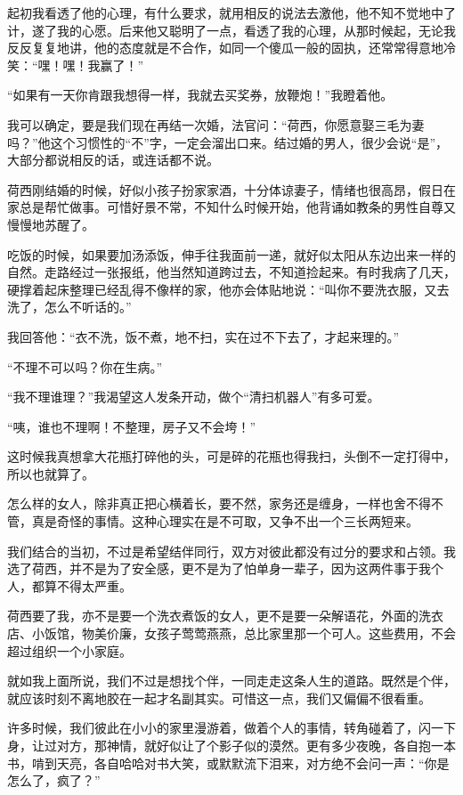 \par 起初我看透了他的心理，有什么要求，就用相反的说法去激他，他不知不觉地中了计，遂了我的心愿。后来他又聪明了一点，看透了我的心理，从那时候起，无论我反反复复地讲，他的态度就是不合作，如同一个傻瓜一般的固执，还常常得意地冷笑：“嘿！嘿！我赢了！”
\par “如果有一天你肯跟我想得一样，我就去买奖券，放鞭炮！”我瞪着他。
\par 我可以确定，要是我们现在再结一次婚，法官问：“荷西，你愿意娶三毛为妻吗？”他这个习惯性的“不”字，一定会溜出口来。结过婚的男人，很少会说“是”，大部分都说相反的话，或连话都不说。
\par 荷西刚结婚的时候，好似小孩子扮家家酒，十分体谅妻子，情绪也很高昂，假日在家总是帮忙做事。可惜好景不常，不知什么时候开始，他背诵如教条的男性自尊又慢慢地苏醒了。
\par 吃饭的时候，如果要加汤添饭，伸手往我面前一递，就好似太阳从东边出来一样的自然。走路经过一张报纸，他当然知道跨过去，不知道捡起来。有时我病了几天，硬撑着起床整理已经乱得不像样的家，他亦会体贴地说：“叫你不要洗衣服，又去洗了，怎么不听话的。”
\par 我回答他：“衣不洗，饭不煮，地不扫，实在过不下去了，才起来理的。”
\par “不理不可以吗？你在生病。”
\par “我不理谁理？”我渴望这人发条开动，做个“清扫机器人”有多可爱。
\par “咦，谁也不理啊！不整理，房子又不会垮！”
\par 这时候我真想拿大花瓶打碎他的头，可是碎的花瓶也得我扫，头倒不一定打得中，所以也就算了。
\par 怎么样的女人，除非真正把心横着长，要不然，家务还是缠身，一样也舍不得不管，真是奇怪的事情。这种心理实在是不可取，又争不出一个三长两短来。
\par 我们结合的当初，不过是希望结伴同行，双方对彼此都没有过分的要求和占领。我选了荷西，并不是为了安全感，更不是为了怕单身一辈子，因为这两件事于我个人，都算不得太严重。
\par 荷西要了我，亦不是要一个洗衣煮饭的女人，更不是要一朵解语花，外面的洗衣店、小饭馆，物美价廉，女孩子莺莺燕燕，总比家里那一个可人。这些费用，不会超过组织一个小家庭。
\par 就如我上面所说，我们不过是想找个伴，一同走走这条人生的道路。既然是个伴，就应该时刻不离地胶在一起才名副其实。可惜这一点，我们又偏偏不很看重。
\par 许多时候，我们彼此在小小的家里漫游着，做着个人的事情，转角碰着了，闪一下身，让过对方，那神情，就好似让了个影子似的漠然。更有多少夜晚，各自抱一本书，啃到天亮，各自哈哈对书大笑，或默默流下泪来，对方绝不会问一声：“你是怎么了，疯了？”
